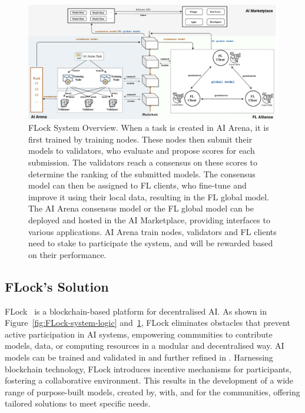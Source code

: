 \documentclass[conference]{IEEEtran}
\begin{document}
\begin{figure}[t]
\centering
\includegraphics[width=2\columnwidth]{figures/flock-system-overview_simplified.pdf}
\caption{FLock System Overview. When a task is created in AI Arena, it is first trained by training nodes. These nodes then submit their models to validators, who evaluate and propose scores for each submission. The validators reach a consensus on these scores to determine the ranking of the submitted models. The consensus model can then be assigned to FL clients, who fine-tune and improve it using their local data, resulting in the FL global model. The AI Arena consensus model or the FL global model can be deployed and hosted in the AI Marketplace, providing interfaces to various applications. AI Arena train nodes, validators and FL clients need to stake to participate the system, and will be rewarded based on their performance.}
\label{fig:FLock-system}
\end{figure}


\subsection{FLock's Solution}




FLock~\cite{dong2022FLock,dong2023defending} is a blockchain-based platform for decentralised AI.  As shown in Figure~\ref{fig:FLock-system-logic} and~\ref{fig:FLock-system}, FLock eliminates obstacles that prevent active participation in AI systems, empowering communities to contribute models, data, or computing resources in a modular and decentralised way. AI models can be trained and validated in \SNT and further refined in \FL. Harnessing blockchain technology, FLock introduces incentive mechanisms for participants, fostering a collaborative environment. This results in the development of a wide range of purpose-built models, created by, with, and for the communities, offering tailored solutions to meet specific needs.
\end{document}
